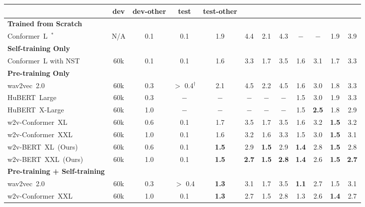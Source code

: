 \documentclass{article}
\begin{document}
\begin{table}[htbp]
{\begin{tabular}{lccccccccccc}
     & \bfseries dev & \bfseries dev-other & \bfseries test & \bfseries test-other \\
    \midrule
    \bfseries Trained from Scratch \\
    \quad  Conformer~L~\cite{zhang2020pushing}$^{*}$
    & N/A & 0.1 & 0.1
    & 1.9 & 4.4 & 2.1 & 4.3
    & $-$ & $-$ & 1.9 & 3.9 \\
    \midrule
    \bfseries Self-training Only \\
    \quad  Conformer~L with NST~\cite{zhang2020pushing}
    & 60k & 0.1 & 0.1
    & 1.6 & 3.3 & 1.7 & 3.5
    & 1.6 & 3.1 & 1.7 & 3.3 \\
    \midrule
    \bfseries Pre-training Only \\
    \quad wav2vec~2.0~\cite{xu2021self}
    & 60k & 0.3 & $>$ 0.4$^{\dagger}$
    & 2.1 & 4.5 & 2.2 & 4.5
    & 1.6 & 3.0 & 1.8 & 3.3 \\ 
    \quad HuBERT~Large~\cite{hsu2021hubert}
    & 60k & 0.3 & $-$
    & $-$ & $-$ & $-$ & $-$
    & 1.5 & 3.0 & 1.9 & 3.3 \\
    \quad HuBERT~X-Large~\cite{hsu2021hubert}
    & 60k & 1.0 & $-$
    &  $-$ & $-$ & $-$ & $-$
    &  1.5 & \textbf{2.5} & 1.8 & 2.9 \\
    \quad w2v-Conformer~XL~\cite{zhang2020pushing}
    & 60k & 0.6 & 0.1
    & 1.7 & 3.5 & 1.7 & 3.5
    & 1.6 & 3.2 & \bfseries 1.5 & 3.2 \\
    \quad w2v-Conformer~XXL~\cite{zhang2020pushing}
    & 60k & 1.0 & 0.1
    & 1.6 & 3.2 & 1.6 & 3.3 
    & 1.5 & 3.0 & \bfseries 1.5 & 3.1 \\
    \quad w2v-BERT~XL~(Ours)
    & 60k & 0.6 & 0.1
    & \textbf{1.5} & 2.9 & \bfseries 1.5 & 2.9
    & \bfseries 1.4 & 2.8 & \bfseries 1.5 & 2.8 \\
    \quad w2v-BERT~XXL~(Ours) 
    & 60k & 1.0 & 0.1
    & \textbf{1.5} & \textbf{2.7} & \textbf{1.5} & \textbf{2.8}
    & \textbf{1.4} & {2.6} & \textbf{1.5} & \textbf{2.7} \\
    \midrule
    \bfseries Pre-training + Self-training \\
    \quad  wav2vec~2.0~\cite{xu2021self}
    & 60k & 0.3 & $>$ 0.4
    & \bfseries 1.3 & 3.1 &  1.7 & 3.5
    & \bfseries 1.1 & 2.7 & 1.5 & 3.1 \\
    \quad  w2v-Conformer~XXL~\cite{zhang2020pushing}
    & 60k & 1.0 & 0.1
    &  \bfseries 1.3 & 2.7 & 1.5 & 2.8
    &  1.3 & 2.6 & \bfseries 1.4 & 2.7 \\

\end{tabular}}
\end{table}
\end{document}
